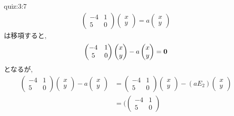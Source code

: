 \begin{answerof}{quiz:3:7} 
  \begin{align*}
    \begin{pmatrix}-4&1\\5&0\end{pmatrix}
    \begin{pmatrix}x\\y\end{pmatrix}
      =
      a\begin{pmatrix}x\\y\end{pmatrix}
  \end{align*}
  は移項すると,
  \begin{align*}
    \begin{pmatrix}-4&1\\5&0\end{pmatrix}
      \begin{pmatrix}x\\y\end{pmatrix}
        -
        a\begin{pmatrix}x\\y\end{pmatrix}
      =\boldsymbol{0}
  \end{align*}
  となるが,
  \begin{align*}
    \begin{pmatrix}-4&1\\5&0\end{pmatrix}
      \begin{pmatrix}x\\y\end{pmatrix}
        -
        a\begin{pmatrix}x\\y\end{pmatrix}
        &=
    \begin{pmatrix}-4&1\\5&0\end{pmatrix}
      \begin{pmatrix}x\\y\end{pmatrix}
        -
        (aE_2)\begin{pmatrix}x\\y\end{pmatrix}\\
        &=
        (\begin{pmatrix}-4&1\\5&0\end{pmatrix}

\end{align*}
\end{answerof}
